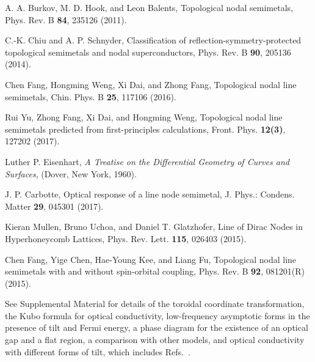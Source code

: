 \documentclass[aps,twocolumn,floatfix]{revtex4-1}
\begin{document}
\begin{thebibliography}{999}

A. A. Burkov, M. D. Hook, and Leon Balents,
Topological nodal semimetals,
Phys. Rev. B {\bf 84}, 235126 (2011).

C.-K. Chiu and A. P. Schnyder,
Classification of reflection-symmetry-protected topological semimetals and nodal superconductors,
Phys. Rev. B {\bf 90}, 205136 (2014).

Chen Fang, Hongming Weng, Xi Dai, and Zhong Fang,
Topological nodal line semimetals,
Chin. Phys. B  {\bf 25}, 117106 (2016).

Rui Yu, Zhong Fang, Xi Dai, and Hongming Weng,
Topological nodal line semimetals predicted from first-principles calculations,
Front. Phys. {\bf 12(3)}, 127202 (2017).

Luther P. Eisenhart, \textit{A Treatise on the Differential Geometry of Curves and Surfaces}, (Dover, New York, 1960).

J. P. Carbotte,
Optical response of a line node semimetal,
J. Phys.: Condens. Matter {\bf 29}, 045301 (2017).

Kieran Mullen, Bruno Uchoa, and Daniel T. Glatzhofer,
Line of Dirac Nodes in Hyperhoneycomb Lattices,
Phys. Rev. Lett. {\bf 115}, 026403 (2015).

Chen Fang, Yige Chen, Hae-Young Kee, and Liang Fu,
Topological nodal line semimetals with and without spin-orbital coupling,
Phys. Rev. B {\bf 92}, 081201(R) (2015).

See Supplemental Material for details of the toroidal coordinate transformation, the Kubo formula for optical conductivity, low-frequency asymptotic forms in the presence of tilt and Fermi energy, a phase diagram for the existence of an optical gap and a flat region, a comparison with other models, and optical conductivity with different forms of tilt, which includes Refs.~\cite{Mahan, Koshino2016}.


\end{thebibliography}
\end{document}
